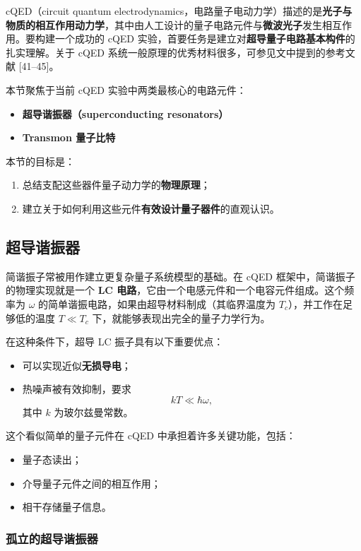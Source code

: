 \documentclass[12pt,a4paper,oneside]{ctexbook}
\begin{document}
cQED（circuit quantum electrodynamics，电路量子电动力学）描述的是\textbf{光子与物质的相互作用动力学}，其中由人工设计的量子电路元件与\textbf{微波光子}发生相互作用。要构建一个成功的 cQED 实验，首要任务是建立对\textbf{超导量子电路基本构件}的扎实理解。关于 cQED 系统一般原理的优秀材料很多，可参见文中提到的参考文献 [41--45]。

本节聚焦于当前 cQED 实验中两类最核心的电路元件：
\begin{itemize}[leftmargin=2em]
    \item \textbf{超导谐振器（superconducting resonators）}
    \item \textbf{Transmon 量子比特}
\end{itemize}

本节的目标是：
\begin{enumerate}[leftmargin=2em]
    \item 总结支配这些器件量子动力学的\textbf{物理原理}；
    \item 建立关于如何利用这些元件\textbf{有效设计量子器件}的直观认识。
\end{enumerate}

\subsection{超导谐振器}

简谐振子常被用作建立更复杂量子系统模型的基础。在 cQED 框架中，简谐振子的物理实现就是一个 \textbf{LC 电路}，它由一个电感元件和一个电容元件组成。这个频率为 \(\omega\) 的简单谐振电路，如果由超导材料制成（其临界温度为 \(T_c\)），并工作在足够低的温度 \(T\ll T_c\) 下，就能够表现出完全的量子力学行为。

在这种条件下，超导 LC 振子具有以下重要优点：
\begin{itemize}[leftmargin=2em]
    \item 可以实现近似\textbf{无损导电}；
    \item 热噪声被有效抑制，要求
    \[
        kT \ll \hbar\omega,
    \]
    其中 \(k\) 为玻尔兹曼常数。
\end{itemize}

这个看似简单的量子元件在 cQED 中承担着许多关键功能，包括：
\begin{itemize}[leftmargin=2em]
    \item 量子态读出；
    \item 介导量子元件之间的相互作用；
    \item 相干存储量子信息。
\end{itemize}

\subsubsection{孤立的超导谐振器}
\end{document}
